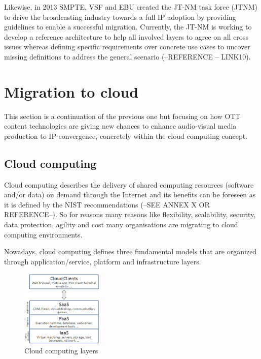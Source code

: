 Likewise, in 2013 SMPTE, VSF and EBU created the JT-NM task force (JTNM) to drive the broadcasting industry towards a full IP adoption by providing guidelines to enable a successful migration. Currently, the JT-NM is working to develop a reference architecture to help all involved layers to agree on all cross issues whereas defining specific requirements over concrete use cases to uncover missing definitions to address the general scenario (--REFERENCE -- LINK10).

\section{Migration to cloud}

This section is a continuation of the previous one but focusing on how OTT content technologies are giving new chances to enhance audio-visual media production to IP convergence, concretely within the cloud computing concept. 

\subsection{Cloud computing}

Cloud computing describes the delivery of shared computing resources (software and/or data) on demand through the Internet and its benefits can be foreseen as it is defined by the NIST recommendations (--SEE ANNEX X OR REFERENCE--). So for reasons many reasons like flexibility, scalability, security, data protection, agility and cost many organisations are migrating to cloud computing environments. 

Nowadays, cloud computing defines three fundamental models that are organized through application/service, platform and infrastructure layers.

\begin{figure}[htb]
\begin{center}
\includegraphics[width=0.35\textwidth]{./images/Cloud_computing_layers.png}
\caption{Cloud computing layers}
\label{F:cloudComputingLayers}
\end{center}
\end{figure}

